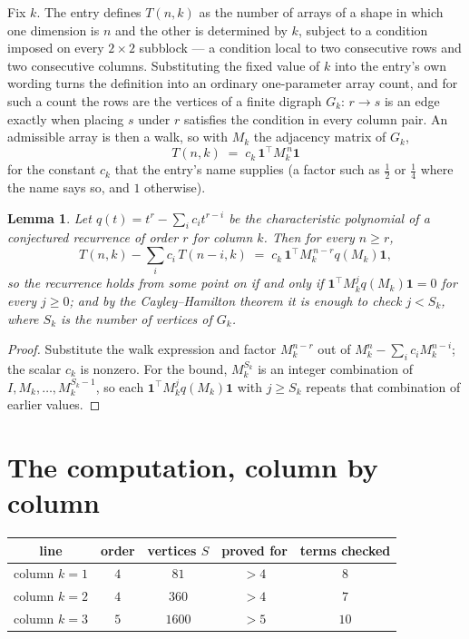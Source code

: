\documentclass[11pt,a4paper]{article}
\theoremstyle{plain}
\newtheorem{lemma}[theorem]{Lemma}
\theoremstyle{definition}
\begin{document}
Fix $k$. The entry defines $T(n,k)$ as the number of arrays of a shape in which one dimension
is $n$ and the other is determined by $k$, subject to a condition imposed on every
$2\times2$ subblock --- a condition local to two consecutive rows and two consecutive columns.
Substituting the fixed value of $k$ into the entry's own wording turns the definition into an
ordinary one-parameter array count, and for such a count the rows are the vertices of a finite
digraph $G_k$: $r\to s$ is an edge exactly when placing $s$ under $r$ satisfies the condition
in every column pair. An admissible array is then a walk, so with $M_k$ the adjacency matrix
of $G_k$,
\[
T(n,k)\;=\;c_k\,\mathbf{1}^{\!\top}M_k^{\,n}\mathbf{1}
\]
for the constant $c_k$ that the entry's name supplies (a factor such as $\tfrac12$ or
$\tfrac14$ where the name says so, and $1$ otherwise).

\begin{lemma}\label{lem:crit}
Let $q(t)=t^{r}-\sum_i c_it^{r-i}$ be the characteristic polynomial of a conjectured
recurrence of order $r$ for column $k$. Then for every $n\ge r$,
\[
T(n,k)-\sum_i c_i\,T(n-i,k)\;=\;c_k\,\mathbf{1}^{\!\top}M_k^{\,n-r}q(M_k)\mathbf{1},
\]
so the recurrence holds from some point on if and only if
$\mathbf{1}^{\!\top}M_k^{j}q(M_k)\mathbf{1}=0$ for every $j\ge0$; and by the
Cayley--Hamilton theorem it is enough to check $j<S_k$, where $S_k$ is the number of vertices
of $G_k$.
\end{lemma}

\begin{proof}
Substitute the walk expression and factor $M_k^{n-r}$ out of $M_k^{n}-\sum_ic_iM_k^{n-i}$;
the scalar $c_k$ is nonzero. For the bound, $M_k^{S_k}$ is an integer combination of
$I,M_k,\dots,M_k^{S_k-1}$, so each $\mathbf{1}^{\!\top}M_k^{j}q(M_k)\mathbf{1}$ with
$j\ge S_k$ repeats that combination of earlier values.
\end{proof}

\section{The computation, column by column}

\begin{center}
\begin{tabular}{ccccc}
line & order & vertices $S$ & proved for & terms checked \\ \hline
column $k$$=1$ & $4$ & $81$ & $>4$ & $8$ \\
column $k$$=2$ & $4$ & $360$ & $>4$ & $7$ \\
column $k$$=3$ & $5$ & $1600$ & $>5$ & $10$ \\
\end{tabular}
\end{center}
\end{document}

